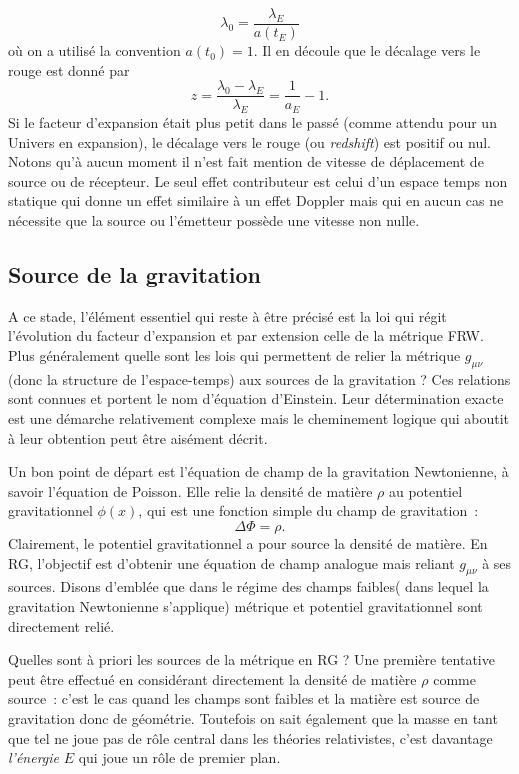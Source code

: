 \begin{equation}
\lambda_0=\frac{\lambda_E}{a(t_E)}
\end{equation}
où on a utilisé la convention $a(t_0)=1$. Il en découle que le décalage vers le rouge est donné par
\begin{equation}
z = \frac{\lambda_0-\lambda_E}{\lambda_E}=\frac{1}{a_E}-1.
\end{equation}
Si le facteur d'expansion était plus petit dans le passé (comme attendu pour un Univers en expansion), le décalage vers le rouge (ou \textit{redshift}) est positif ou nul. Notons qu'à aucun moment il n'est fait mention de vitesse de déplacement de source ou de récepteur. Le seul effet contributeur est celui d'un espace temps non statique qui donne un effet similaire à un effet Doppler mais qui en aucun cas ne nécessite que la source ou l'émetteur possède une vitesse non nulle.



\subsection{Source de la gravitation}
A ce stade, l'élément essentiel qui reste à être précisé est la loi qui régit l'évolution du facteur d'expansion et par extension celle de la métrique FRW. Plus généralement quelle sont les lois qui permettent de relier la métrique $g_{\mu\nu}$ (donc la structure de l'espace-temps) aux sources de la gravitation ? Ces relations sont connues et portent le nom d'équation d'Einstein. Leur détermination exacte est une démarche relativement complexe mais le cheminement logique qui aboutit à leur obtention peut être aisément décrit. 

Un bon point de départ est l'équation de champ de la gravitation Newtonienne, à savoir l'équation de Poisson. Elle relie la densité de matière $\rho$ au potentiel gravitationnel $\phi(x)$, qui est une fonction simple du champ de gravitation~:
\begin{equation}
\Delta \Phi =\rho.
\label{e:poisson}
\end{equation}
Clairement, le potentiel gravitationnel a pour source la densité de matière. En RG, l'objectif est d'obtenir une équation de champ analogue mais reliant $g_{\mu\nu}$ à ses sources. Disons d'emblée que dans le régime des champs faibles( dans lequel la gravitation Newtonienne s'applique) métrique et potentiel gravitationnel sont directement relié.

Quelles sont à priori les sources de la métrique en RG ? Une première tentative peut être effectué en considérant directement la densité de matière $\rho$ comme source~: c'est le cas quand les champs sont faibles et la matière est source de gravitation donc de géométrie. Toutefois on sait également que la masse en tant que tel ne joue pas de rôle central dans les théories relativistes, c'est davantage \textit{l'énergie} $E$ qui joue un rôle de premier plan. 

